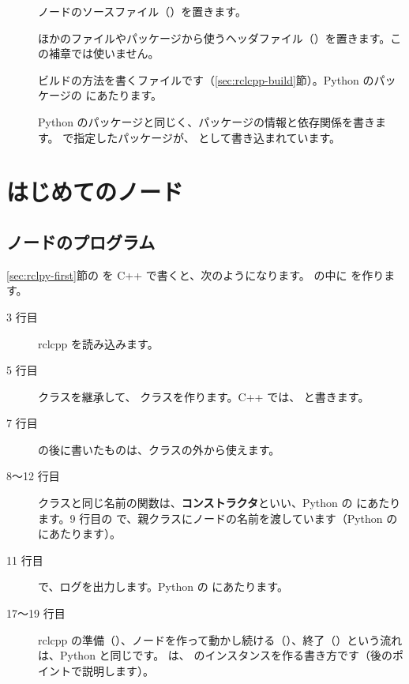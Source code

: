 \begin{description}
  \item[] ノードのソースファイル（）を置きます。
  \item[] ほかのファイルやパッケージから使うヘッダファイル（）を置きます。この補章では使いません。
  \item[] ビルドの方法を書くファイルです（\ref{sec:rclcpp-build}節）。Python のパッケージの  にあたります。
  \item[] Python のパッケージと同じく、パッケージの情報と依存関係を書きます。 で指定したパッケージが、 として書き込まれています。
\end{description}

\section{はじめてのノード}
\label{sec:rclcpp-first}

\subsection{ノードのプログラム}

\ref{sec:rclpy-first}節の  を C++ で書くと、次のようになります。
 の中に  を作ります。


\begin{description}
  \item[3 行目] rclcpp を読み込みます。
  \item[5 行目]  クラスを継承して、 クラスを作ります。C++ では、 と書きます。
  \item[7 行目]  の後に書いたものは、クラスの外から使えます。
  \item[8〜12 行目] クラスと同じ名前の関数は、\textbf{コンストラクタ}といい、Python の  にあたります。9 行目の  で、親クラスにノードの名前を渡しています（Python の  にあたります）。
  \item[11 行目]  で、ログを出力します。Python の  にあたります。
  \item[17〜19 行目] rclcpp の準備（）、ノードを作って動かし続ける（）、終了（）という流れは、Python と同じです。 は、 のインスタンスを作る書き方です（後のポイントで説明します）。
\end{description}

